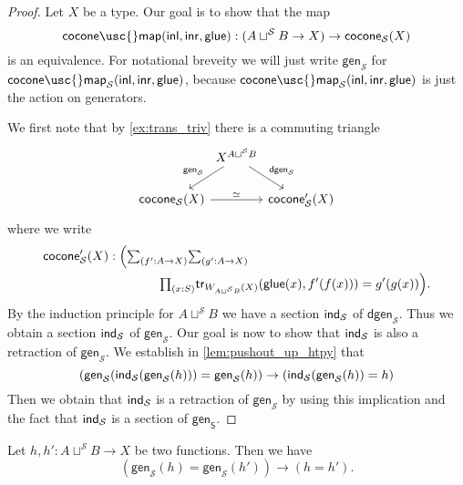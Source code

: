 \begin{proof}
Let $X$ be a type. Our goal is to show that the map
\begin{equation*}
\mathsf{cocone\usc{}map}(\inl,\inr,\glue):(A\sqcup^{\mathcal{S}} B \to X)\to \mathsf{cocone}_{\mathcal{S}}(X)
\end{equation*}
is an equivalence. For notational breveity we will just write $\mathsf{gen}_{\mathcal{S}}$ for $\mathsf{cocone\usc{}map}_{\mathcal{S}}(\inl,\inr,\glue)$, because $\mathsf{cocone\usc{}map}_{\mathcal{S}}(\inl,\inr,\glue)$ is just the action on generators.

We first note that by \cref{ex:trans_triv} there is a commuting triangle
\begin{equation*}
\begin{tikzcd}[column sep=0]
& X^{A\sqcup^{\mathcal{S}} B} \arrow[dl,swap,"\mathsf{gen}_{\mathcal{S}}"] \arrow[dr,"\mathsf{dgen}_{\mathcal{S}}"] \\
\mathsf{cocone}_{\mathcal{S}}(X) \arrow[rr,"\eqvsym"] & & \mathsf{cocone}'_{\mathcal{S}}(X)
\end{tikzcd}
\end{equation*}
where we write
\begin{align*}
\mathsf{cocone}'_{\mathcal{S}}(X) & : \Big(\sm{f': A\to X}{g':A\to X}\Big.\\
& \qquad\qquad\Big.\prd{x:S} \mathsf{tr}_{W_{A\sqcup^{\mathcal{S}}B}(X)}(\glue(x),f'(f(x)))=g'(g(x))\Big).
\end{align*}
By the induction principle for $A\sqcup^{\mathcal{S}} B$ we have a section $\mathsf{ind}_{\mathcal{S}}$ of $\mathsf{dgen}_{\mathcal{S}}$. Thus we obtain a section $\mathsf{ind}_{\mathcal{S}}$ of $\mathsf{gen}_{\mathcal{S}}$. Our goal is now to show that $\mathsf{ind}_{\mathcal{S}}$ is also a retraction of $\mathsf{gen}_{\mathcal{S}}$. We establish in \cref{lem:pushout_up_htpy} that
\begin{equation*}
(\mathsf{gen}_{\mathcal{S}}(\mathsf{ind}_{\mathcal{S}}(\mathsf{gen}_{\mathcal{S}}(h)))= \mathsf{gen}_{\mathcal{S}}(h))
\to (\mathsf{ind}_{\mathcal{S}}(\mathsf{gen}_{\mathcal{S}}(h))= h)
\end{equation*}
Then we obtain that $\mathsf{ind}_{\mathcal{S}}$ is a retraction of $\mathsf{gen}_{\mathcal{S}}$ by using this implication and the fact that $\mathsf{ind}_{\mathcal{S}}$ is a section of $\mathsf{gen}_{\mathsf{S}}$.
\end{proof}

\begin{lem}\label{lem:pushout_up_htpy}
Let $h,h':A\sqcup^{\mathcal{S}}B\to X$ be two functions. Then we have
\begin{equation*}
(\mathsf{gen}_{\mathcal{S}}(h)=\mathsf{gen}_{\mathcal{S}}(h'))\to (h=h').
\end{equation*}
\end{lem}

